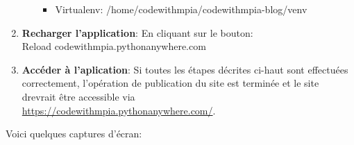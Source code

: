 \documentclass[a4paper,11pt]{article}
\begin{document}
\begin{enumerate}
\begin{itemize}
\begin{itemize}
                            \item Virtualenv: /home/codewithmpia/codewithmpia-blog/venv
                        \end{itemize}
                \end{itemize}
                \item \textbf{Recharger l'application}: En cliquant sur le bouton:\\ Reload codewithmpia.pythonanywhere.com
                \item \textbf{Accéder à l'aplication}: Si toutes les étapes décrites ci-haut sont effectuées correctement, 
                l'opération de publication du site est terminée et le site drevrait être accessible via \\
                \url{https://codewithmpia.pythonanywhere.com/}.
        \end{enumerate}

        \noindent Voici quelques captures d'écran: 
\end{document}
